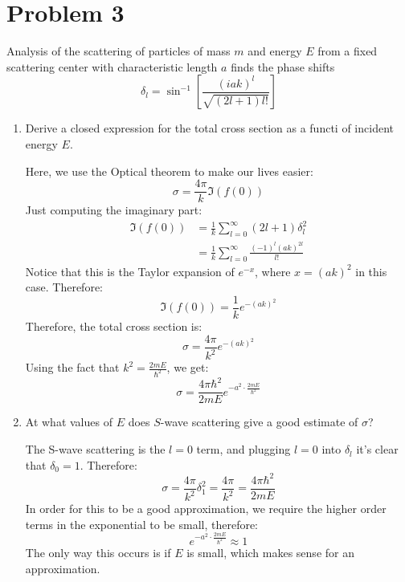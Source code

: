 \documentclass[10pt]{article}
\begin{document}
	\section*{Problem 3}
	Analysis of the scattering of particles of mass $m$ and energy $E$ from a fixed scattering center with 
	characteristic length $a$ finds the phase shifts
	\[
		\delta_l = \sin^{-1} \left[ \frac{(iak)^l}{\sqrt{(2l + 1)l!} }\right]
	\] 
	\begin{enumerate}[label=\alph*)]
		\item Derive a closed expression for the total cross section as a functi of incident energy $E$.
			
			\begin{solution}
				Here, we use the Optical theorem to make our lives easier: 
				\[
				\sigma = \frac{4\pi}{k}\Im(f(0))
				\] 
				Just computing the imaginary part:
				\begin{align*}
					\Im(f(0)) &= \frac{1}{k}\sum_{l = 0}^\infty (2l +1) \delta_l^2\\
							  &= \frac{1}{k}\sum_{l = 0}^\infty \frac{(-1)^l (ak)^{2l}}{l!}
				\end{align*}
				Notice that this is the Taylor expansion of $e^{-x}$, where $x = (ak)^2$ in this case. Therefore:
				\[
					\Im(f(0)) = \frac{1}{k}e^{-(ak)^2}
				\] 
				Therefore, the total cross section is: 
				\[
					\sigma = \frac{4\pi}{k^2}e^{-(ak)^2}
				\] 
				Using the fact that $k^2 = \frac{2mE}{\hbar^2}$, we get: 
				\[
					\sigma = \frac{4\pi \hbar^2}{2mE} e^{-a^2 \cdot  \frac{2mE}{\hbar^2}}
				\] 
			\end{solution}
		\item At what values of $E$ does $S$-wave scattering give a good estimate of  $\sigma$?

			\begin{solution}
				The S-wave scattering is the $l = 0$ term, and plugging $l = 0$ into $\delta_l$ it's clear
				that $\delta_0 = 1$. Therefore: 
				\[
					\sigma = \frac{4\pi}{k^2}\delta_1^2 = \frac{4\pi}{k^2} = \frac{4\pi \hbar^2}{2mE}
				\] 
				In order for this to be a good approximation, we require the higher order terms in the 
				exponential to be small, therefore: 
				\[
					e^{-a^2 \cdot \frac{2mE}{\hbar^2}} \approx 1
				\] 
				The only way this occurs is if $E$ is small, which makes sense for an approximation.
			\end{solution}
	\end{enumerate}

	\pagebreak
\end{document}

